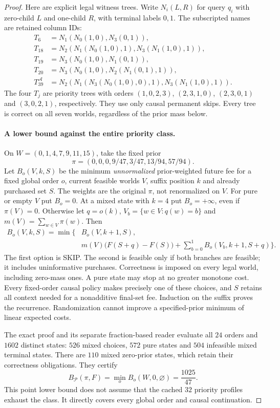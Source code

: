 \begin{proof}
Here are explicit legal witness trees. Write $N_i(L,R)$ for
query $q_i$ with zero-child $L$ and one-child $R$, with terminal
labels $0,1$. The subscripted names are retained column IDs:
\begin{align*}
 T_6&=N_1(N_0(1,0),N_3(0,1)),\\
 T_{18}&=N_2(N_1(N_0(1,0),1),N_3(N_1(1,0),1)),\\
 T_{19}&=N_3(N_0(1,0),N_1(0,1)),\\
 T_{20}&=N_3(N_0(1,0),N_2(N_1(0,1),1)),\\
 T_{39}^{\mathcal A}
   &=N_2(N_1(N_3(N_0(1,0),0),1),N_3(N_1(1,0),1)).
\end{align*}
The four $T_j$ are priority trees with orders $(1,0,2,3)$,
$(2,3,1,0)$, $(2,3,0,1)$ and $(3,0,2,1)$, respectively.
They use only causal permanent skips. Every tree is correct on
all seven worlds, regardless of the prior mass below.

\paragraph*{A lower bound against the entire priority class.}
On $W=(0,1,4,7,9,11,15)$, take the fixed prior
\[
 \pi=(0,0,0,9/47,3/47,13/94,57/94).
\]
Let $B_o(V,k,S)$ be the minimum \emph{unnormalized} prior-weighted
future fee for a fixed global order $o$, current feasible worlds
$V$, suffix position $k$ and already purchased set $S$.
The weights are the original $\pi$, not renormalized on $V$.
For pure or empty $V$ put $B_o=0$. At a mixed state with $k=4$
put $B_o=+\infty$, even if $\pi(V)=0$. Otherwise let $q=o(k)$,
$V_b=\{w\in V:q(w)=b\}$ and $m(V)=\sum_{w\in V}\pi(w)$.
Then
\begin{align}
 B_o(V,k,S)=\min\bigl\{&B_o(V,k+1,S),\nonumber\\
 &m(V)\bigl(F(S+q)-F(S)\bigr)
       +\sum_{b=0}^1 B_o(V_b,k+1,S+q)\bigr\}.
 \label{eq:gs-fullclass-bellman}
\end{align}
The first option is SKIP. The second is feasible only if both
branches are feasible; it includes uninformative purchases.
Correctness is imposed on every legal world, including zero-mass
ones. A pure state may stop at no greater monotone cost. Every
fixed-order causal policy makes precisely one of these choices,
and $S$ retains all context needed for a nonadditive final-set fee.
Induction on the suffix proves the recurrence. Randomization
cannot improve a specified-prior minimum of linear expected costs.

The exact proof and its separate fraction-based reader evaluate
all $24$ orders and $1602$ distinct states: $526$ mixed choices,
$572$ pure states and $504$ infeasible mixed terminal states.
There are $110$ mixed zero-prior states, which retain their
correctness obligations. They certify
\[
 B_{\mathcal P}(\pi,F)
    =\min_o B_o(W,0,\varnothing)=\frac{1025}{47}.
\]
This point lower bound does not assume that the cached $32$
priority profiles exhaust the class. It directly covers every
global order and causal continuation.


\end{proof}
